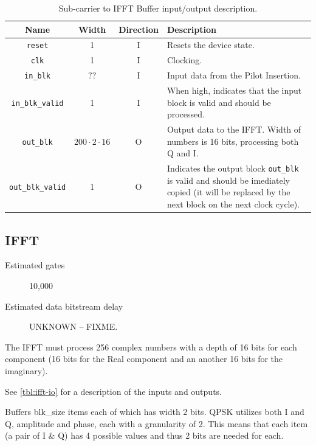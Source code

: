 \documentclass[dvips,10pt,twocolumn]{article}
\newcommand{\wire}{\texttt}
\begin{document}
\begin{table}\begin{tabularx}{\linewidth}{c|c|c|X}
	\label{tbl:ifft-buffer-io}
			
	Name & Width & Direction & Description \\ \hline

	\wire{reset} & 1 & I & Resets the device state. \\

	\wire{clk}   & 1 & I & Clocking. \\

	\wire{in\_blk} & $??$ & I & Input data from the Pilot Insertion. \\

	\wire{in\_blk\_valid} & 1 & I & When high, indicates that the input block is
	valid and should be processed. \\

	\wire{out\_blk} & $200 \cdot 2 \cdot 16$ & O & Output data to the IFFT. Width of
	numbers is 16 bits, processing both Q and I. \\

	\wire{out\_blk\_valid} & 1 & O & Indicates the output block
	\wire{out\_blk} is valid and should be imediately copied (it will be
	replaced by the next block on the next clock cycle).

\end{tabularx}
\caption{Sub-carrier to IFFT Buffer input/output description.}
\end{table}




\subsection{IFFT}
\label{sec:ifft}
\begin{description}
	\item[Estimated gates] 10,000
	\item[Estimated data bitstream delay] UNKNOWN -- FIXME.
\end{description}

The IFFT must process 256 complex numbers with a depth of 16 bits for each
component (16 bits for the Real component and an another 16 bits for the
imaginary).

See \autoref{tbl:ifft-io} for a description of the inputs and outputs.
	
	Buffers blk\_size items each of which has width 2 bits.
	QPSK utilizes both I and Q, amplitude and phase, each with
	a granularity of 2. This means that each item (a pair of I
	\& Q) has 4 possible values and thus 2 bits are needed for
	each.
\end{document}
